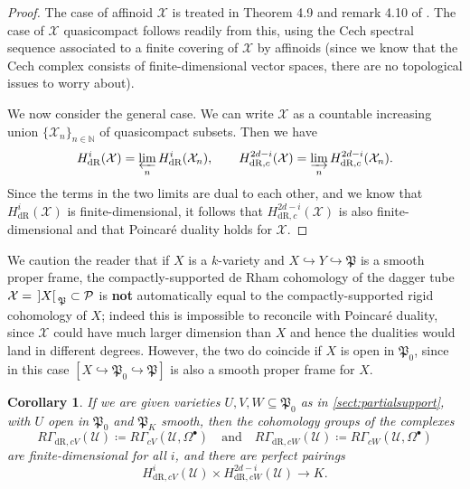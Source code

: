 \documentclass[cjm]{ipart}
\theoremstyle{plain}
\newtheorem{corollary}[theorem]{Corollary}
\theoremstyle{remark}
\DeclarePairedDelimiter{\tb}{{\,]}}{{[\, }} %
\newcommand{\cP}{\mathcal{P}}
\newcommand{\cU}{\mathcal{U}}
\newcommand{\cX}{\mathcal{X}}
\newcommand{\dR}{\mathrm{dR}}
\newcommand{\fP}{\mathfrak{P}}
\newcommand{\into}{\hookrightarrow}
\numberwithin{equation}{subsection}
\begin{document}
   \begin{proof}
    The case of affinoid $\cX$ is treated in Theorem 4.9 and remark 4.10 of \cite{grossekloenne00}. The case of $\cX$ quasicompact follows readily from this, using the Cech spectral sequence associated to a finite covering of $\cX$ by affinoids (since we know that the Cech complex consists of finite-dimensional vector spaces, there are no topological issues to worry about).

    We now consider the general case. We can write $\cX$ as a countable increasing union $\{\cX_n\}_{n \in \mathbb{N}}$ of quasi\-compact subsets. Then we have
    \[ H^i_{\dR}(\cX) = \varprojlim_n H^i_{\dR}(\cX_n), \qquad H^{2d-i}_{\dR, c}(\cX) = \varinjlim_n H^{2d-i}_{\dR, c}(\cX_n).\]
    Since the terms in the two limits are dual to each other, and we know that $H^i_{\dR}(\cX)$ is finite-dimensional, it follows that $H^{2d-i}_{\dR, c}(\cX)$ is also finite-dimensional and that Poincar\'e duality holds for $\cX$.
   \end{proof}

   \begin{remark}
    \label{rmk:rigidcpctsupp}
    We caution the reader that if $X$ is a $k$-variety and $X \into Y \into \mathfrak{P}$ is a smooth proper frame, the compactly-supported de Rham cohomology of the dagger tube $\cX = \tb{X}_{\fP} \subset \cP$ is \textbf{not} automatically equal to the compactly-supported rigid cohomology of $X$; indeed this is impossible to reconcile with Poincar\'e duality, since $\cX$ could have much larger dimension than $X$ and hence the dualities would land in different degrees. However, the two do coincide if $X$ is open in $\fP_0$, since in this case $\left[ X \into \fP_0 \into \fP \right]$ is also a smooth proper frame for $X$.
   \end{remark}


   \begin{corollary}
    \label{cor:partialpoincare}
    If we are given varieties $U, V, W \subseteq \fP_0$ as in \cref{sect:partialsupport}, with $U$ open in $\fP_0$ and $\fP_K$ smooth, then the cohomology groups of the complexes
    \[ R\Gamma_{\dR, cV}(\cU) \coloneqq R\Gamma_{cV}(\cU, \Omega^\bullet) \quad \text{and}\quad R\Gamma_{\dR, cW}(\cU)\coloneqq R\Gamma_{cW}(\cU, \Omega^\bullet) \]
    are finite-dimensional for all $i$, and there are perfect pairings
    \[ H^i_{\dR, cV}(\cU) \times H^{2d-i}_{\dR, cW}(\cU) \to K. \]
   \end{corollary}
\end{document}
